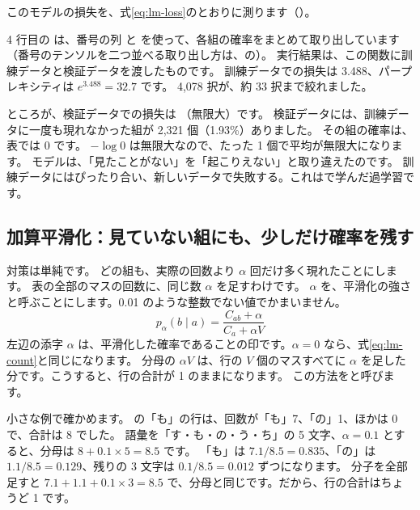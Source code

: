 このモデルの損失を、式\eqref{eq:lm-loss}のとおりに測ります（）。

\par{} %

4 行目の  は、番号の列  と  を使って、各組の確率をまとめて取り出しています（番号のテンソルを二つ並べる取り出し方は、の）。
実行結果は、この関数に訓練データと検証データを渡したものです。
訓練データでの損失は 3.488、パープレキシティは $e^{3.488}=32.7$ です。
4,078 択が、約 33 択まで絞れました。

ところが、検証データでの損失は （無限大）です。
検証データには、訓練データに一度も現れなかった組が 2,321 個（1.93\%）ありました。
その組の確率は、表では 0 です。
$-\log 0$ は無限大なので、たった 1 個で平均が無限大になります。
モデルは、「見たことがない」を「起こりえない」と取り違えたのです。
訓練データにはぴったり合い、新しいデータで失敗する。これはで学んだ過学習です。

\subsection*{加算平滑化：見ていない組にも、少しだけ確率を残す}

対策は単純です。
どの組も、実際の回数より $\alpha$ 回だけ多く現れたことにします。
表の全部のマスの回数に、同じ数 $\alpha$ を足すわけです。
$\alpha$ を、平滑化の強さと呼ぶことにします。0.01 のような整数でない値でかまいません。
\begin{equation}
p_{\alpha}(b\mid a)=\frac{C_{ab}+\alpha}{C_a+\alpha V}
\label{eq:lm-smooth}
\end{equation}
左辺の添字 $\alpha$ は、平滑化した確率であることの印です。$\alpha=0$ なら、式\eqref{eq:lm-count}と同じになります。
分母の $\alpha V$ は、行の $V$ 個のマスすべてに $\alpha$ を足した分です。こうすると、行の合計が 1 のままになります。
この方法をと呼びます。

小さな例で確かめます。
の「も」の行は、回数が「も」7、「の」1、ほかは 0 で、合計は 8 でした。
語彙を「す・も・の・う・ち」の 5 文字、$\alpha=0.1$ とすると、分母は $8+0.1\times5=8.5$ です。
「も」は $7.1/8.5=0.835$、「の」は $1.1/8.5=0.129$、残りの 3 文字は $0.1/8.5=0.012$ ずつになります。
分子を全部足すと $7.1+1.1+0.1\times3=8.5$ で、分母と同じです。だから、行の合計はちょうど 1 です。

